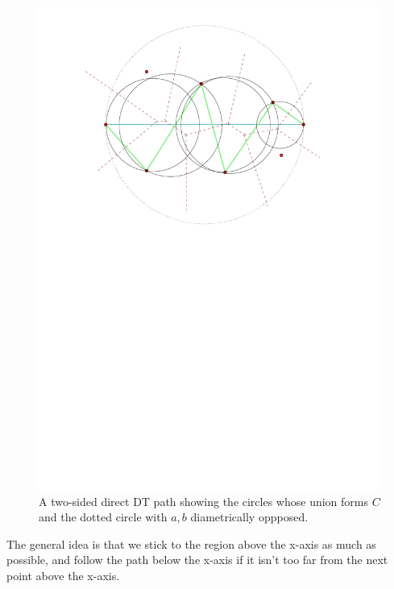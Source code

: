 \documentclass{tufte-handout}
\begin{document}
\begin{figure}
  \includegraphics[scale=1.0]{figures/two_sided_path_center_circles.pdf}
  \caption{A two-sided direct DT path showing the circles whose union
    forms $C$ and the dotted circle with $a,b$ diametrically
    oppposed.}
\end{figure}

The general idea is that we stick to the region above the x-axis as
much as possible, and follow the path below the x-axis if it isn't too
far from the next point above the x-axis.

\newpage
\end{document}
